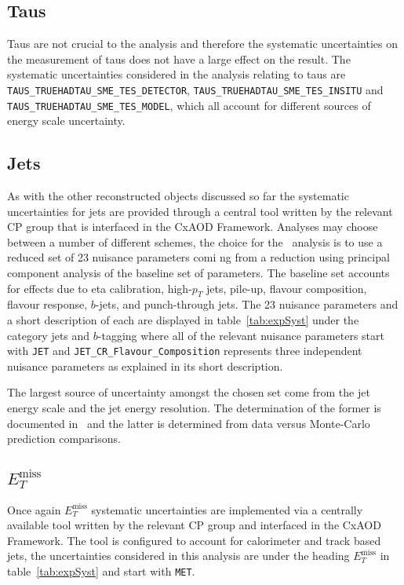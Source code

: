 \subsection{Taus}

Taus are not crucial to the analysis and therefore the systematic uncertainties
on the measurement of taus does not have a large effect on the result. The
systematic uncertainties considered in the analysis relating to taus are
\texttt{TAUS\_TRUEHADTAU\_SME\_TES\_DETECTOR},
\texttt{TAUS\_TRUEHADTAU\_SME\_TES\_INSITU} and
\texttt{TAUS\_TRUEHADTAU\_SME\_TES\_MODEL}, which all account for different
sources of energy scale uncertainty.

\subsection{Jets}

As with the other reconstructed objects discussed so far the systematic
uncertainties for jets are provided through a central tool written by the
relevant CP group that is interfaced in the CxAOD Framework. Analyses may choose
between a number of different schemes, the choice for the \VHbb\ analysis is to
use a reduced set of 23 nuisance parameters comi
ng from a reduction using
principal component analysis of the baseline set of parameters. The baseline set
accounts for effects due to eta calibration, high-$p_T$ jets, pile-up, flavour
composition, flavour response, $b$-jets, and punch-through jets. The 23 nuisance
parameters and a short description of each are displayed in
table~\ref{tab:expSyst} under the category jets and $b$-tagging where all of the
relevant nuisance parameters start with \texttt{JET} and
\texttt{JET\_CR\_Flavour\_Composition} represents three independent nuisance
parameters as explained in its short description.

The largest source of uncertainty amongst the chosen set come from the jet
energy scale and the jet energy resolution. The determination of the former is
documented in~\cite{JetCalibration2015} and the latter is determined from data
versus Monte-Carlo prediction comparisons.

\subsection{$E_T^{\text{miss}}$}

Once again $E_T^{\text{miss}}$ systematic uncertainties are implemented via a
centrally available tool written by the relevant CP group and interfaced in the
CxAOD Framework. The tool is configured to account for calorimeter and track
based jets, the uncertainties considered in this analysis are under the heading
$E_T^{\text{miss}}$ in table~\ref{tab:expSyst} and start with \texttt{MET}.

